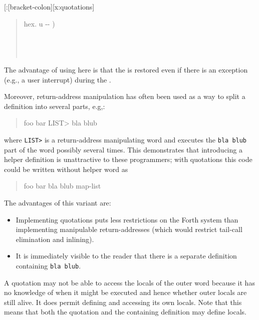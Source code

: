 \begin{worddef}{}{[:}[bracket-colon][x:quotations]
\begin{rationale}
		\begin{quote}\ttfamily
		\word{:} hex.  u -{}- ) \\
		\tab {}   \\
		\tab \word{[:}   \word{;]}  \\
		\tab {}  \word{!}  \\
		\word{;}
		\end{quote}

		The advantage of using  here is that
		the  is restored even if there is an exception (e.g.,
		a user interrupt) during the .

		Moreover, return-address manipulation has often been used as a way to
		split a definition into several parts, e.g,:

		\begin{quote}\ttfamily
		\word{:} foo bar LIST> bla blub \word{;}
		\end{quote}

		where \texttt{LIST>} is a return-address manipulating word and executes
		the \texttt{bla blub} part of the word possibly several times.  This
		demonstrates that introducing a helper definition is unattractive to
		these programmers; with quotations this code could be written without
		helper word as

		\begin{quote}\ttfamily
			\word{:} foo bar \word{[:} bla blub \word{;]} map-list \word{;}
		\end{quote}

		The advantages of this variant are:
		\begin{itemize}
		\item Implementing quotations puts less restrictions on the Forth
			system than implementing manipulable return-addresses
			(which would restrict tail-call elimination and inlining).
		\item It is immediately visible to the reader that there is a
			separate definition containing \texttt{bla blub}.
		\end{itemize}
		
		A quotation may not be able to access the locals of the outer word
		because it has no knowledge of when it might be executed and hence
		whether outer locals are still alive. It does permit defining and
		accessing its own locals.  Note that this means that both the
		quotation and the containing definition may define locals.
	\end{rationale}
	

\end{worddef}
